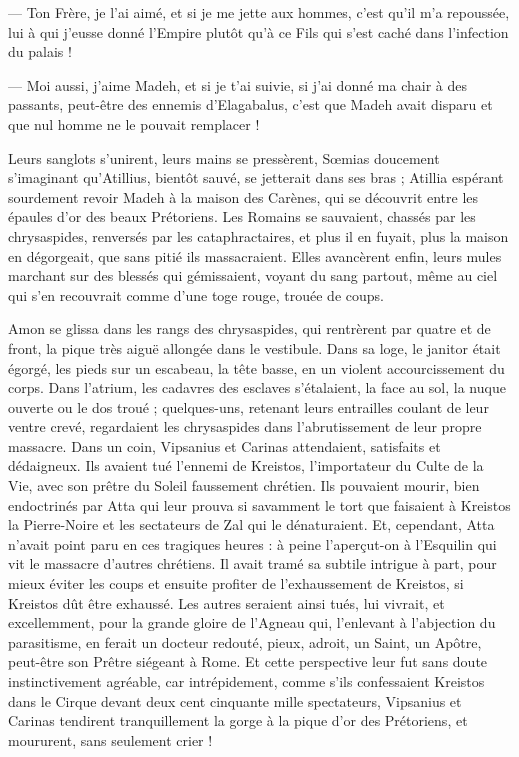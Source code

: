 \documentclass[a4paper, 11pt, oneside, polutonikogreek, french]{article}
\begin{document}
--- Ton Frère, je l'ai aimé, et si je me jette aux hommes, c'est qu'il m'a repoussée, lui à qui j'eusse donné l'Empire plutôt qu'à ce Fils qui s'est caché dans l'infection du palais !

--- Moi aussi, j'aime Madeh, et si je t'ai suivie, si j'ai donné ma chair à des passants, peut-être des ennemis d'Elagabalus, c'est que Madeh avait disparu et que nul homme ne le pouvait remplacer !

Leurs sanglots s'unirent, leurs mains se pressèrent, Sœmias doucement s'imaginant qu'Atillius, bientôt sauvé, se jetterait dans ses bras ; Atillia espérant sourdement revoir Madeh à la maison des Carènes, qui se découvrit entre les épaules d'or des beaux Prétoriens. Les Romains se sauvaient, chassés par les chrysaspides, renversés par les cataphractaires, et plus il en fuyait, plus la maison en dégorgeait, que sans pitié ils massacraient. Elles avancèrent enfin, leurs mules marchant sur des blessés qui gémissaient, voyant du sang partout, même au ciel qui s'en recouvrait comme d'une toge rouge, trouée de coups.

Amon se glissa dans les rangs des chrysaspides, qui rentrèrent par quatre et de front, la pique très aiguë allongée dans le vestibule. Dans sa loge, le janitor était égorgé, les pieds sur un escabeau, la tête basse, en un violent accourcissement du corps. Dans l'atrium, les cadavres des esclaves s'étalaient, la face au sol, la nuque ouverte ou le dos troué ; quelques-uns, retenant leurs entrailles coulant de leur ventre crevé, regardaient les chrysaspides dans l'abrutissement de leur propre massacre. Dans un coin, Vipsanius et Carinas attendaient, satisfaits et dédaigneux. Ils avaient tué l'ennemi de Kreistos, l'importateur du Culte de la Vie, avec son prêtre du Soleil faussement chrétien. Ils pouvaient mourir, bien endoctrinés par Atta qui leur prouva si savamment le tort que faisaient à Kreistos la Pierre-Noire et les sectateurs de Zal qui le dénaturaient. Et, cependant, Atta n'avait point paru en ces tragiques heures : à peine l'aperçut-on à l'Esquilin qui vit le massacre d'autres chrétiens. Il avait tramé sa subtile intrigue à part, pour mieux éviter les coups et ensuite profiter de l'exhaussement de Kreistos, si Kreistos dût être exhaussé. Les autres seraient ainsi tués, lui vivrait, et excellemment, pour la grande gloire de l'Agneau qui, l'enlevant à l'abjection du parasitisme, en ferait un docteur redouté, pieux, adroit, un Saint, un Apôtre, peut-être son Prêtre siégeant à Rome. Et cette perspective leur fut sans doute instinctivement agréable, car intrépidement, comme s'ils confessaient Kreistos dans le Cirque devant deux cent cinquante mille spectateurs, Vipsanius et Carinas tendirent tranquillement la gorge à la pique d'or des Prétoriens, et moururent, sans seulement crier !
\end{document}
